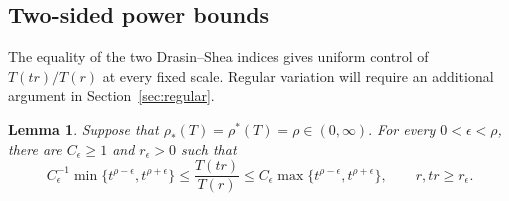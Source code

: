 \documentclass[12pt,letterpaper,reqno]{amsart}
\newtheorem{lem}[thm]{Lemma}
\theoremstyle{definition}
\numberwithin{equation}{section}
\begin{document}
\subsection{Two-sided power bounds}
\label{sec:power-bounds}

The equality of the two Drasin--Shea indices gives uniform control of
\(T(tr)/T(r)\) at every fixed scale. Regular variation will require an
additional argument in Section~\ref{sec:regular}.

\begin{lem}\label{lem:power-bounds}
Suppose that
$
\rho_*(T)=\rho^*(T)=\rho\in(0,\infty).
$
For every \(0<\epsilon<\rho\), there are
\(C_\epsilon\geq1\) and \(r_\epsilon>0\) such that
\begin{equation}\label{eq:power-bounds}
 C_\epsilon^{-1}
 \min\{t^{\rho-\epsilon},t^{\rho+\epsilon}\}
 \leq
 \frac{T(tr)}{T(r)}
 \leq
 C_\epsilon
 \max\{t^{\rho-\epsilon},t^{\rho+\epsilon}\},
 \qquad
 r,tr\geq r_\epsilon.
\end{equation}
\end{lem}
\end{document}
